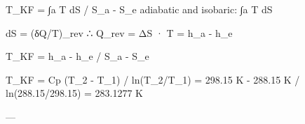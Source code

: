 T_KF = ∫a T dS / S_a - S_e  
adiabatic and isobaric: ∫a T dS  

dS = (δQ/T)_rev  
∴ Q_rev = ΔS · T = h_a - h_e  

T_KF = h_a - h_e / S_a - S_e  

T_KF = Cp (T_2 - T_1) / ln(T_2/T_1)  
= 298.15 K - 288.15 K / ln(288.15/298.15)  
= 283.1277 K  

---